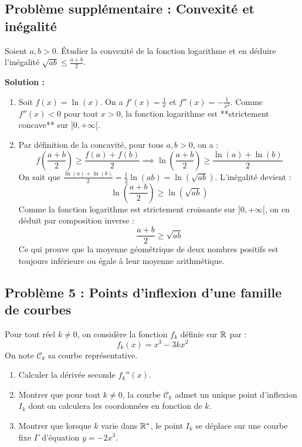 \subsection*{Problème supplémentaire : Convexité et inégalité}
Soient $a, b > 0$. Étudier la convexité de la fonction logarithme et en déduire l'inégalité $\sqrt{ab} \le \frac{a+b}{2}$.

\textbf{Solution :}
\begin{enumerate}
    \item Soit $f(x) = \ln(x)$. On a $f'(x) = \frac{1}{x}$ et $f''(x) = -\frac{1}{x^2}$.
    Comme $f''(x) < 0$ pour tout $x > 0$, la fonction logarithme est **strictement concave** sur $]0, +\infty[$.
    \item Par définition de la concavité, pour tous $a, b > 0$, on a :
    \[
    f\left(\frac{a+b}{2}\right) \ge \frac{f(a)+f(b)}{2} \implies \ln\left(\frac{a+b}{2}\right) \ge \frac{\ln(a)+\ln(b)}{2}
    \]
    On sait que $\frac{\ln(a)+\ln(b)}{2} = \frac{1}{2} \ln(ab) = \ln(\sqrt{ab})$.
    L'inégalité devient :
    \[
    \ln\left(\frac{a+b}{2}\right) \ge \ln(\sqrt{ab})
    \]
    Comme la fonction logarithme est strictement croissante sur $]0, +\infty[$, on en déduit par composition inverse :
    \[
    \frac{a+b}{2} \ge \sqrt{ab}
    \]
    Ce qui prouve que la moyenne géométrique de deux nombres positifs est toujours inférieure ou égale à leur moyenne arithmétique.
\end{enumerate}

\subsection*{Problème 5 : Points d'inflexion d'une famille de courbes}
Pour tout réel $k \ne 0$, on considère la fonction $f_k$ définie sur $\mathbb{R}$ par :
\[
f_k(x) = x^3 - 3kx^2
\]
On note $\mathcal{C}_k$ sa courbe représentative.
\begin{enumerate}
    \item Calculer la dérivée seconde $f_k''(x)$.
    \item Montrer que pour tout $k \ne 0$, la courbe $\mathcal{C}_k$ admet un unique point d'inflexion $I_k$ dont on calculera les coordonnées en fonction de $k$.
    \item Montrer que lorsque $k$ varie dans $\mathbb{R}^*$, le point $I_k$ se déplace sur une courbe fixe $\Gamma$ d'équation $y = -2x^3$.
\end{enumerate}

